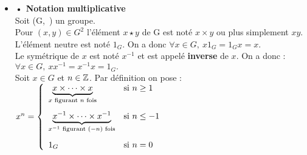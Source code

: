 \vspace{1.4cm}

\begin{itemize}[leftmargin=0cm]
    \item[] \hspace{0.5cm} \textbf{• Notation multiplicative}\vspace{0.3cm}\\
    Soit (G,\ \lci) un groupe.\vspace{0.1cm}\\
    Pour \((x,y)\in G^2\) l'élément \(x\star y\) de G est noté \(x\times y\) ou plus simplement \(xy\).\\
    L'élément neutre est noté \(1_G.\) On a donc \(\forall x\in G,\ x1_G=1_Gx=x.\)\\
    Le symétrique de \(x\) est noté \(x^{-1}\) et est appelé \textbf{inverse} de \(x\). On a donc : \(\forall x\in G,\ xx^{-1}=x^{-1}x=1_G.\)\vspace{0.4cm}\\
    Soit \(x\in G\) et \(n\in \mathbb{Z}\).
    Par définition on pose : \( x^n= \left\{
    \begin{array}{ll}
        \underset{x \text{ figurant } n \text{ fois} }{\underbrace{x\times \cdots \times x}} & \text{si } n\geq 1 \vspace{0.3cm} \\
        \underset{x^{-1} \text{ figurant } (-n) \text{ fois} }{\underbrace{x^{-1}\times \cdots \times x^{-1}}} & \text{si } n\leq -1\vspace{0.3cm} \\
        1_G & \text{si } n=0
    \end{array}
    \right. \)

    \newpage


\end{itemize}
